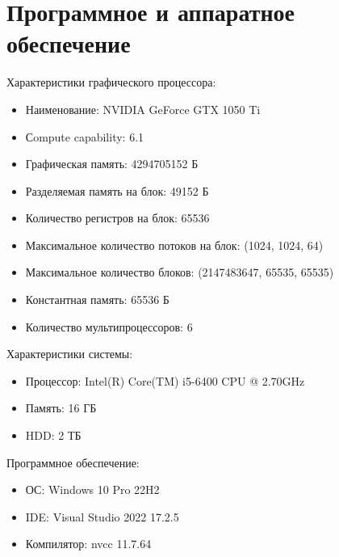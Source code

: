 \section{Программное и аппаратное обеспечение}
Характеристики графического процессора:
\begin{itemize}[noitemsep, topsep=0pt]
	\item Наименование: NVIDIA GeForce GTX 1050 Ti
	\item Сompute capability: 6.1
	\item Графическая память: 4294705152 Б
	\item Разделяемая память на блок: 49152 Б
	\item Количество регистров на блок: 65536
	\item Максимальное количество потоков на блок: (1024, 1024, 64)
	\item Максимальное количество блоков: (2147483647, 65535, 65535)
	\item Константная память: 65536 Б
	\item Количество мультипроцессоров: 6
\end{itemize}

Характеристики системы:
\begin{itemize}[noitemsep, topsep=0pt]
	\item Процессор: Intel(R) Core(TM) i5-6400 CPU @ 2.70GHz
	\item Память: 16 ГБ
	\item HDD: 2 ТБ
\end{itemize}

Программное обеспечение:
\begin{itemize}[noitemsep, topsep=0pt]
	\item ОС: Windows 10 Pro 22H2
	\item IDE: Visual Studio 2022 17.2.5
	\item Компилятор: nvcc 11.7.64
\end{itemize}